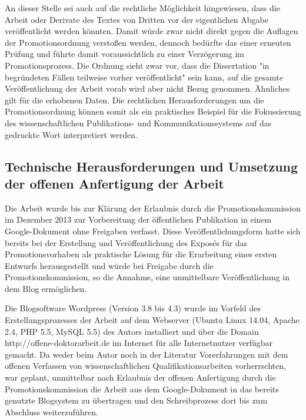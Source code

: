 An dieser Stelle sei auch auf die rechtliche Möglichkeit hingewiesen, dass die Arbeit oder Derivate des Textes von Dritten vor der eigentlichen Abgabe veröffentlicht werden könnten. Damit würde zwar nicht direkt gegen die Auflagen der Promotionsordnung verstoßen werden, dennoch bedürfte das einer erneuten Prüfung und führte damit voraussichtlich zu einer Verzögerung im Promotionsprozess. Die Ordnung sieht zwar vor, dass die Dissertation "in begründeten Fällen teilweise vorher veröffentlicht" \cite{Leuphana_2011} sein kann, auf die gesamte Veröffentlichung der Arbeit vorab wird aber nicht Bezug genommen. Ähnliches gilt für die erhobenen Daten. Die rechtlichen Herausforderungen um die Promotionsordnung können somit als ein praktisches Beispiel für die Fokussierung des wissenschaftlichen Publikations- und Kommunikationssystems auf das gedruckte Wort interpretiert werden.

\subsection{Technische Herausforderungen und Umsetzung der offenen Anfertigung der Arbeit}

Die Arbeit wurde bis zur Klärung der Erlaubnis durch die Promotionskommission im Dezember 2013 zur Vorbereitung der öffentlichen Publikation in einem Google-Dokument ohne Freigaben verfasst. Diese Veröffentlichungsform hatte sich bereits bei der Erstellung und Veröffentlichung des Exposés für das Promotionsvorhaben \cite{Heise_2012a} als praktische Lösung für die Erarbeitung eines ersten Entwurfs herausgestellt und würde bei Freigabe durch die Promotionskommission, so die Annahme, eine unmittelbare Veröffentlichung in dem Blog ermöglichen.

Die Blogsoftware Wordpress (Version 3.8 bis 4.3) wurde im Vorfeld des Erstellungsprozesses der Arbeit auf dem Webserver (Ubuntu Linux 14.04, Apache 2.4, PHP 5.5, MySQL 5.5) des Autors installiert und über die Domain http://offene-doktorarbeit.de im Internet für alle Internetnutzer verfügbar gemacht. Da weder beim Autor noch in der Literatur Vorerfahrungen mit dem offenen Verfassen von wissenschaftlichen Qualifikationsarbeiten vorherrschten, war geplant, unmittelbar nach Erlaubnis der offenen Anfertigung durch die Promotionskommission die Arbeit aus dem Google-Dokument in das bereits genutzte Blogsystem zu übertragen und den Schreibprozess dort bis zum Abschluss weiterzuführen.

